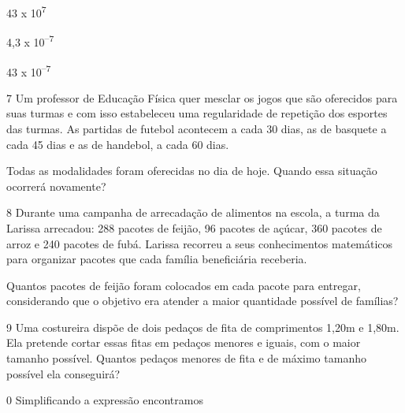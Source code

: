 \begin{escolha}
\begin{escolha}
  \item 43 x 10\textsuperscript{7}

  \item 4,3 x 10\textsuperscript{--7}

  \item 43 x 10\textsuperscript{--7} 

\end{escolha}


\num{7} Um professor de Educação Física quer mesclar os jogos que são
oferecidos para suas turmas e com isso estabeleceu uma regularidade de
repetição dos esportes das turmas. As partidas de futebol acontecem a 
cada 30 dias, as de basquete a cada 45 dias e as de handebol, a cada 60 dias.

Todas as modalidades foram oferecidas no dia de hoje. Quando essa
situação ocorrerá novamente?


\num{8} Durante uma campanha de arrecadação de alimentos na escola,
a turma da Larissa arrecadou: 288 pacotes de feijão, 96 pacotes de açúcar,
360 pacotes de arroz e 240 pacotes de fubá. Larissa recorreu a seus
conhecimentos matemáticos para organizar pacotes que cada família
beneficiária receberia.

Quantos pacotes de feijão foram colocados em cada pacote para entregar,
considerando que o objetivo era atender a maior quantidade possível de
famílias?


\num{9} Uma costureira dispõe de dois pedaços de fita de comprimentos
1,20m e 1,80m. Ela pretende cortar essas fitas em pedaços menores e 
iguais, com o maior tamanho possível. Quantos pedaços menores de fita 
e de máximo tamanho possível ela conseguirá?


\num{0} Simplificando a expressão  encontramos


\end{escolha}
